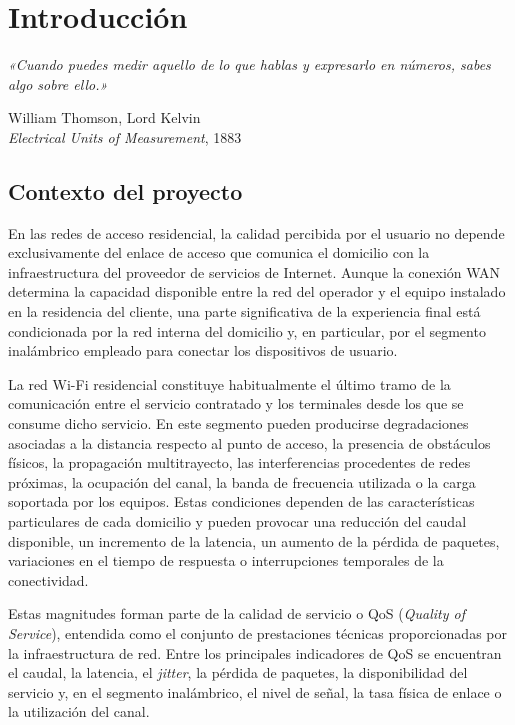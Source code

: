 %
%

\chapter{Introducción}
\label{cha:introduccion}

\epigraph{
    \textit{«Cuando puedes medir aquello de lo que hablas y expresarlo
    en números, sabes algo sobre ello.»}
}{
    William Thomson, Lord Kelvin\\
    \textit{Electrical Units of Measurement}, 1883
}

\section{Contexto del proyecto}
\label{sec:contexto-proyecto}

En las redes de acceso residencial, la calidad percibida por el usuario no 
depende exclusivamente del enlace de acceso que comunica el domicilio con la 
infraestructura del proveedor de servicios de Internet. Aunque la conexión 
WAN determina la capacidad disponible entre la red del operador y el equipo 
instalado en la residencia del cliente, una parte significativa de la 
experiencia final está condicionada por la red interna del domicilio y, 
en particular, por el segmento inalámbrico empleado para conectar los dispositivos 
de usuario.

La red Wi-Fi residencial constituye habitualmente el último tramo de la
comunicación entre el servicio contratado y los terminales desde los que
se consume dicho servicio. En este segmento pueden producirse
degradaciones asociadas a la distancia respecto al punto de acceso, la
presencia de obstáculos físicos, la propagación multitrayecto, las
interferencias procedentes de redes próximas, la ocupación del canal, la
banda de frecuencia utilizada o la carga soportada por los equipos. Estas
condiciones dependen de las características particulares de cada
domicilio y pueden provocar una reducción del caudal disponible, un
incremento de la latencia, un aumento de la pérdida de paquetes,
variaciones en el tiempo de respuesta o interrupciones temporales de la
conectividad.

Estas magnitudes forman parte de la calidad de servicio o QoS
(\textit{Quality of Service}), entendida como el conjunto de prestaciones
técnicas proporcionadas por la infraestructura de red. Entre los
principales indicadores de QoS se encuentran el caudal, la latencia, el
\textit{jitter}, la pérdida de paquetes, la disponibilidad del servicio
y, en el segmento inalámbrico, el nivel de señal, la tasa física de
enlace o la utilización del canal.

